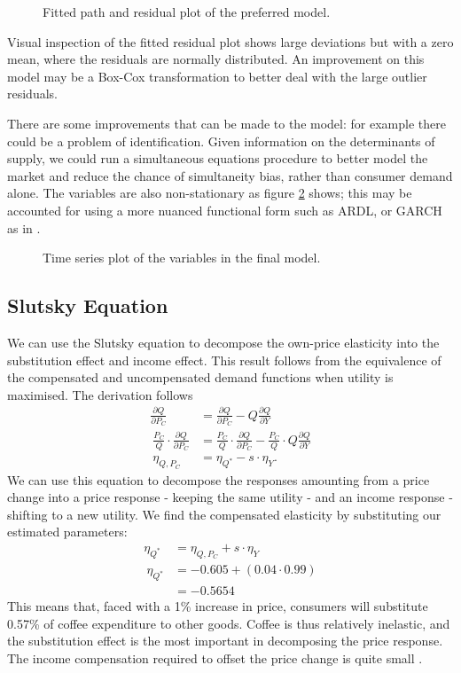 \documentclass[12pt]{article}
\begin{document}
\begin{figure}[!htb]
	\caption{\label{fig:lq} Fitted path and residual plot of the preferred model.}
\end{figure}

Visual inspection of the fitted residual plot shows large deviations but with a zero mean, where the residuals are normally distributed. An improvement on this model may be a Box-Cox transformation to better deal with the large outlier residuals.

There are some improvements that can be made to the model: for example there could be a problem of identification. Given information on the determinants of supply, we could run a simultaneous equations procedure to better model the market and reduce the chance of simultaneity bias, rather than consumer demand alone. The variables are also non-stationary as figure \ref{fig:lvars} shows; this may be accounted for using a more nuanced functional form such as ARDL, or GARCH as in \textcite{aradhyulaGARCHTimeSeries1988}.
\begin{figure}[!htb]
	\caption{\label{fig:lvars} Time series plot of the variables in the final model.}
\end{figure}
\subsection{Slutsky Equation} %
\label{sub:slutsky_equation}
We can use the Slutsky equation to decompose the own-price elasticity into the substitution effect and income effect. This result follows from the equivalence of the compensated and uncompensated demand functions when utility is maximised. The derivation follows 
\begin{align*}
\frac{\partial Q}{\partial P_C} &= \frac{\partial Q}{\partial P_C} - Q\frac{\partial Q}{\partial Y} \\\
\frac{P_C}{Q}\cdot\frac{\partial Q}{\partial P_C} &= \frac{P_C}{Q}\cdot\frac{\partial Q}{\partial P_C} - \frac{P_C}{Q}\cdot Q\frac{\partial Q}{\partial Y}\\\
\eta_{Q, P_C} &= \eta_{Q^*} - s\cdot\eta_{Y}.
\end{align*}
We can use this equation to decompose the responses amounting from a price change into a price response - keeping the same utility - and an income response - shifting to a new utility. We find the compensated elasticity by substituting our estimated parameters:
\begin{align*}
	 \eta_{Q^*} &= \eta_{Q, P_C} + s\cdot\eta_{Y} \\\
	 \eta_{Q^*} &= -0.605 + (0.04\cdot 0.99) \\
	 			&= -0.5654 
\end{align*} 
This means that, faced with a 1\% increase in price, consumers will substitute 0.57\% of coffee expenditure to other goods. Coffee is thus relatively inelastic, and the substitution effect is the most important in decomposing the price response. The income compensation required to offset the price change is quite small \parencite[153]{snyderMicroeconomicTheoryBasic2012}.
\end{document}
